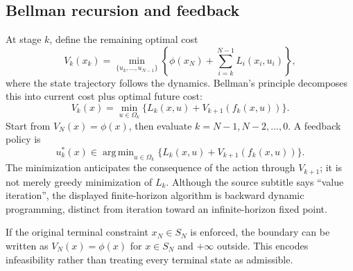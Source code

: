 \documentclass[11pt,a4paper]{article}
\numberwithin{equation}{section}
\numberwithin{figure}{section}
\numberwithin{table}{section}
\DeclareMathOperator*{\argmin}{arg\,min}
\begin{document}
\subsection{Bellman recursion and feedback}
At stage $k$, define the remaining optimal cost
\begin{equation}
V_k(x_k)=\min_{\{u_k,\ldots,u_{N-1}\}}
\left\{\phi(x_N)+\sum_{i=k}^{N-1}L_i(x_i,u_i)\right\},
\end{equation}
where the state trajectory follows the dynamics. Bellman's principle decomposes this into current cost plus optimal future cost:
\begin{equation}\label{eq:bellman}
V_k(x)=\min_{u\in\Omega_k}\{L_k(x,u)+V_{k+1}(f_k(x,u))\}.
\end{equation}
Start from $V_N(x)=\phi(x)$, then evaluate $k=N-1,N-2,\ldots,0$. A feedback policy is
\begin{equation}
u_k^*(x)\in\argmin_{u\in\Omega_k}\{L_k(x,u)+V_{k+1}(f_k(x,u))\}.
\end{equation}
The minimization anticipates the consequence of the action through $V_{k+1}$; it is not merely greedy minimization of $L_k$. Although the source subtitle says ``value iteration'', the displayed finite-horizon algorithm is backward dynamic programming, distinct from iteration toward an infinite-horizon fixed point.

If the original terminal constraint $x_N\in S_N$ is enforced, the boundary can be written as $V_N(x)=\phi(x)$ for $x\in S_N$ and $+\infty$ outside. This encodes infeasibility rather than treating every terminal state as admissible.
\end{document}
